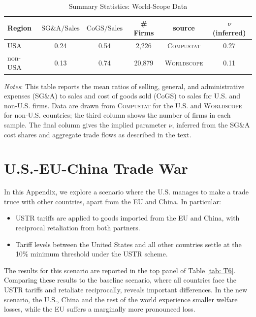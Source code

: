 \documentclass[12pt]{article}
\begin{document}
\begin{table}[htbp]
\caption{Summary Statistics: World-Scope Data}\label{tab: WS}
\centering
\begin{tabular}{lccccc}
\toprule
Region    &  $\text{SG\&A}/\text{Sales}$ & $\text{CoGS}/\text{Sales}$ & \# Firms & source &  $\nu$ (inferred) \\
\midrule
USA      &      0.24  &      0.54  &        2,226 & \textsc{Compustat} & 0.27\\
non-USA  &      0.13  &      0.74  &       20,879 &   \textsc{Worldscope} & 0.11 \\
\bottomrule
\end{tabular}
\begin{flushleft}
\footnotesize{\textit{Notes}: This table reports the mean ratios of selling, general, and administrative expenses (SG\&A) to sales and cost of goods sold (CoGS) to sales for U.S. and non-U.S. firms. Data are drawn from \textsc{Compustat} for the U.S. and \textsc{Worldscope} for non-U.S. countries; the third column shows the number of firms in each sample. The final column gives the implied parameter $\nu$, inferred from the SG\&A cost shares and aggregate trade flows as described in the text.}
\end{flushleft}
\end{table}
\section{U.S.-EU-China Trade War}
\label{app:regional}
In this Appendix, we explore a scenario where the U.S. manages to make a trade truce with other countries, apart from the EU and China. In particular:
\begin{itemize}
    \item USTR tariffs are applied to goods imported from the EU and China, with reciprocal retaliation from both partners.
    \item Tariff levels between the United States and all other countries settle at the 10\% minimum threshold under the USTR scheme.
\end{itemize}
The results for this scenario are reported in the top panel of Table \ref{tab: T6}. Comparing these results to the baseline scenario, where all countries face the USTR tariffs and retaliate reciprocally, reveals important differences. In the new scenario, the U.S., China and the rest of the world experience smaller welfare losses, while the EU suffers a marginally more pronounced loss.
\end{document}
